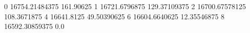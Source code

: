 0 16754.21484375 161.90625
1 16721.6796875 129.37109375
2 16700.67578125 108.3671875
4 16641.8125 49.50390625
6 16604.6640625 12.35546875
8 16592.30859375 0.0
